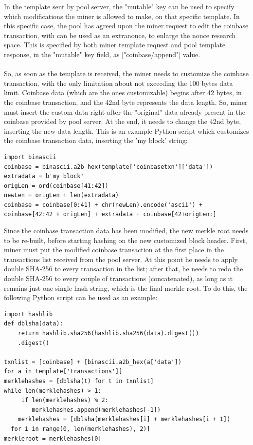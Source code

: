 \noindent In the template sent by pool server, the "mutable" key can be used to specify which modifications the miner is allowed to make, on that specific template.
In this specific case, the pool has agreed upon the miner request to edit the coinbase transaction, with can be used as an extranonce, to enlarge the nonce research space. This is specified by both miner template request and pool template response, in the "mutable" key field, as ["coinbase/append"] value.\\\\
So, as soon as the template is received, the miner needs to customize the coinbase transaction, with the only limitation about not exceeding the 100 bytes data limit. 
Coinbase data (which are the ones customizable) begins after 42 bytes, in the coinbase transaction, and the 42nd byte represents the data length. So, miner must insert the custom data right after the "original" data already present in the coinbase provided by pool server. At the end, it needs to change the 42nd byte, inserting the new data length. This is an example Python script which customizes the coinbase transaction data, inserting the 'my block' string:
\begin{lstlisting}[style=pythonStyle, numbers=none]
import binascii
coinbase = binascii.a2b_hex(template['coinbasetxn']['data'])
extradata = b'my block'
origLen = ord(coinbase[41:42])
newLen = origLen + len(extradata)
coinbase = coinbase[0:41] + chr(newLen).encode('ascii') + 
coinbase[42:42 + origLen] + extradata + coinbase[42+origLen:]
\end{lstlisting}
\medskip
Since the coinbase transaction data has been modified, the new merkle root needs to be re-built, before starting hashing on the new customized block header.
First, miner must put the modified coinbase transaction at the first place in the transactions list received from the pool server. At this point he needs to apply double SHA-256 to every transaction in the list; after that, he needs to redo the double SHA-256 to every couple of transactions (concatenated), as long as it remains just one single hash string, which is the final merkle root.
To do this, the following Python script can be used as an example:
\begin{lstlisting}[style=pythonStyle, numbers=none]
import hashlib
def dblsha(data):
 	return hashlib.sha256(hashlib.sha256(data).digest())
    .digest()

txnlist = [coinbase] + [binascii.a2b_hex(a['data']) 
for a in template['transactions']]
merklehashes = [dblsha(t) for t in txnlist]
while len(merklehashes) > 1:
	 if len(merklehashes) % 2:
	  	merklehashes.append(merklehashes[-1])
 	merklehashes = [dblsha(merklehashes[i] + merklehashes[i + 1])
  for i in range(0, len(merklehashes), 2)]
merkleroot = merklehashes[0]
\end{lstlisting}

